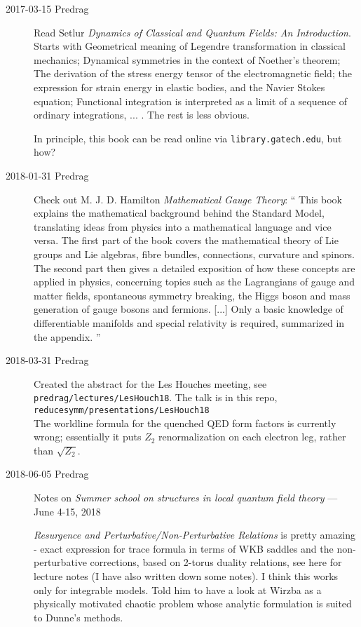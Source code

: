 \begin{description}
\item[2017-03-15 Predrag] Read
Setlur
{\em Dynamics of Classical and Quantum Fields: An Introduction}.
Starts with
Geometrical meaning of Legendre transformation in classical mechanics;
Dynamical symmetries in the context of Noether’s theorem;
The derivation of the stress energy tensor of the electromagnetic field;
the expression for strain energy in elastic bodies, and the Navier Stokes
equation;
Functional integration is interpreted as a limit of a sequence of
ordinary integrations, ... .
The rest is less obvious.

In principle, this book can be read online via
\texttt{library.gatech.edu}, but how?

\item[2018-01-31 Predrag] Check out
M. J. D. Hamilton
{\em Mathematical Gauge Theory}: ``
This book explains the mathematical background behind the Standard Model,
translating ideas from physics into a mathematical language and vice versa.
The first part of the book covers the mathematical theory of Lie groups and
Lie algebras, fibre bundles, connections, curvature and spinors. The second
part then gives a detailed exposition of how these concepts are applied in
physics, concerning topics such as the Lagrangians of gauge and matter
fields, spontaneous symmetry breaking, the Higgs boson and mass generation of
gauge bosons and fermions.
[...] Only a basic knowledge of differentiable manifolds and special
relativity is required, summarized in the appendix.
''

\item[2018-03-31 Predrag] Created the abstract for the Les Houches meeting, see\\
\texttt{predrag/lectures/LesHouch18}.
The talk is in this repo, \\
\texttt{reducesymm/presentations/LesHouch18} \\ %
The worldline formula for the quenched QED form factors is currently
wrong; essentially it puts $Z_2$ renormalization on each electron leg,
rather than $\sqrt{Z_2}$.

\item[2018-06-05 Predrag]
Notes on
{\em Summer school on structures in local quantum field theory}
 — June 4-15, 2018

{\em Resurgence and Perturbative/Non-Perturbative Relations} is pretty
amazing - exact expression for trace formula in terms of WKB saddles and
the non-perturbative corrections, based on 2-torus duality relations, see
{here} for lecture notes (I have also written down some notes). I think
this works only for integrable models. Told him to have a look at
Wirzba as a physically motivated chaotic problem whose
analytic formulation is suited to Dunne's methods.


\end{description}
